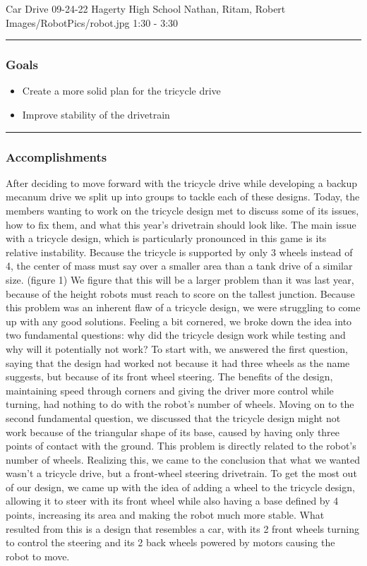\insertmeeting 
	{Car Drive} 
	{09-24-22}
	{Hagerty High School}
	{Nathan, Ritam, Robert}
	{Images/RobotPics/robot.jpg}
	{1:30 - 3:30}
	
\noindent\hfil\rule{\textwidth}{.4pt}\hfil
\subsubsection*{Goals}
\begin{itemize}
    \item Create a more solid plan for the tricycle drive
	\item Improve stability of the drivetrain


\end{itemize} 

\noindent\hfil\rule{\textwidth}{.4pt}\hfil

\subsubsection*{Accomplishments}
After deciding to move forward with the tricycle drive while developing a backup mecanum drive we split up into groups to tackle each of these designs. Today, the members wanting to work on the tricycle design met to discuss some of its issues, how to fix them, and what this year's drivetrain should look like. The main issue with a tricycle design, which is particularly pronounced in this game is its relative instability. Because the tricycle is supported by only 3 wheels instead of 4, the center of mass must say over a smaller area than a tank drive of a similar size. (figure 1) We figure that this will be a larger problem than it was last year, because of the height robots must reach to score on the tallest junction. Because this problem was an inherent flaw of a tricycle design, we were struggling to come up with any good solutions. Feeling a bit cornered, we broke down the idea into two fundamental questions: why did the tricycle design work while testing and why will it potentially not work? To start with, we answered the first question, saying that the design had worked not because it had three wheels as the name suggests, but because of its front wheel steering. The benefits of the design, maintaining speed through corners and giving the driver more control while turning, had nothing to do with the robot’s number of wheels. Moving on to the second fundamental question, we discussed that the tricycle design might not work because of the triangular shape of its base, caused by having only three points of contact with the ground. This problem is directly related to the robot’s number of wheels. Realizing this, we came to the conclusion that what we wanted wasn’t a tricycle drive, but a front-wheel steering drivetrain. To get the most out of our design, we came up with the idea of adding a wheel to the tricycle design, allowing it to steer with its front wheel while also having a base defined by 4  points, increasing its area and making the robot much more stable. What resulted from this is a design that resembles a car, with its 2 front wheels turning to control the steering and its 2 back wheels powered by motors causing the robot to move.


